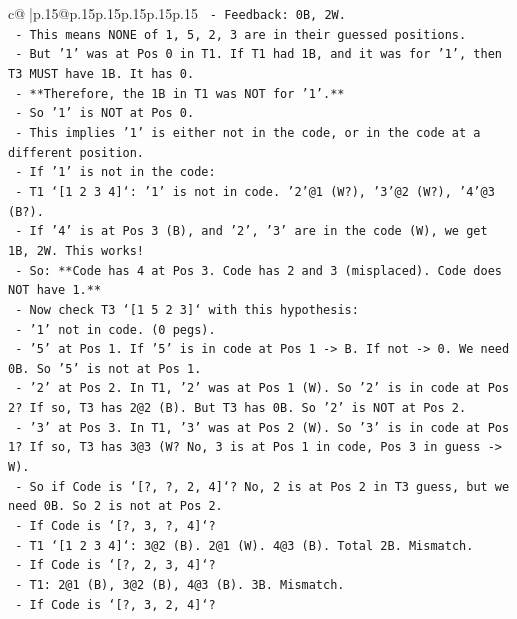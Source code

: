 \documentclass{article}
\begin{document}
{\begin{supertabular}{c@{$\;$}|p{.15\linewidth}@{}p{.15\linewidth}p{.15\linewidth}p{.15\linewidth}p{.15\linewidth}p{.15\linewidth}}
{{{\texttt{  {-} Feedback: 0B, 2W.} \\
\texttt{  {-} This means NONE of 1, 5, 2, 3 are in their guessed positions.} \\
\texttt{  {-} But '1' was at Pos 0 in T1. If T1 had 1B, and it was for '1', then T3 MUST have 1B. It has 0.} \\
\texttt{  {-} **Therefore, the 1B in T1 was NOT for '1'.**} \\
\texttt{  {-} So '1' is NOT at Pos 0.} \\
\texttt{  {-} This implies '1' is either not in the code, or in the code at a different position.} \\
\texttt{  {-} If '1' is not in the code:} \\
\texttt{    {-} T1 `{[}1 2 3 4{]}`: '1' is not in code. '2'@1 (W?), '3'@2 (W?), '4'@3 (B?).} \\
\texttt{    {-} If '4' is at Pos 3 (B), and '2', '3' are in the code (W), we get 1B, 2W. This works!} \\
\texttt{    {-} So: **Code has 4 at Pos 3. Code has 2 and 3 (misplaced). Code does NOT have 1.**} \\
\texttt{    {-} Now check T3 `{[}1 5 2 3{]}` with this hypothesis:} \\
\texttt{      {-} '1' not in code. (0 pegs).} \\
\texttt{      {-} '5' at Pos 1. If '5' is in code at Pos 1 {-}> B. If not {-}> 0. We need 0B. So '5' is not at Pos 1.} \\
\texttt{      {-} '2' at Pos 2. In T1, '2' was at Pos 1 (W). So '2' is in code at Pos 2? If so, T3 has 2@2 (B). But T3 has 0B. So '2' is NOT at Pos 2.} \\
\texttt{      {-} '3' at Pos 3. In T1, '3' was at Pos 2 (W). So '3' is in code at Pos 1? If so, T3 has 3@3 (W? No, 3 is at Pos 1 in code, Pos 3 in guess {-}> W).} \\
\texttt{      {-} So if Code is `{[}?, ?, 2, 4{]}`? No, 2 is at Pos 2 in T3 guess, but we need 0B. So 2 is not at Pos 2.} \\
\texttt{      {-} If Code is `{[}?, 3, ?, 4{]}`?} \\
\texttt{        {-} T1 `{[}1 2 3 4{]}`: 3@2 (B). 2@1 (W). 4@3 (B). Total 2B. Mismatch.} \\
\texttt{      {-} If Code is `{[}?, 2, 3, 4{]}`?} \\
\texttt{        {-} T1: 2@1 (B), 3@2 (B), 4@3 (B). 3B. Mismatch.} \\
\texttt{      {-} If Code is `{[}?, 3, 2, 4{]}`?} \\
}}}
\end{supertabular}}
\end{document}
